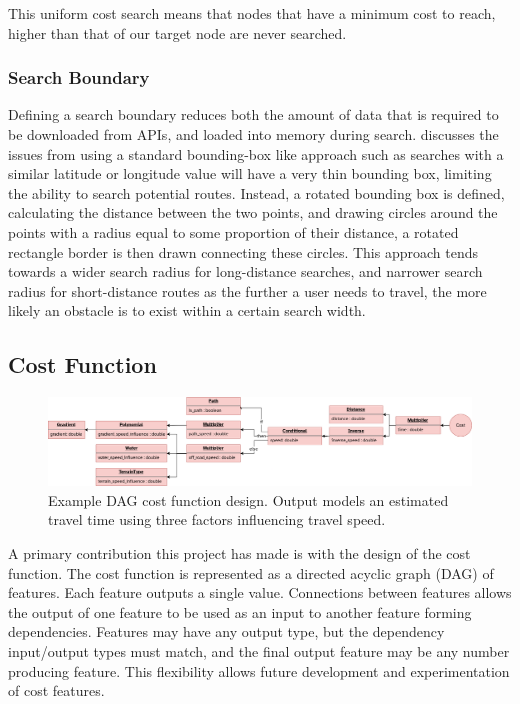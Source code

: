 \documentclass[12pt]{article}
\begin{document}
This uniform cost search means that nodes that have a minimum cost to reach, higher than that of our target node are never searched.

\subsubsection{Search Boundary}

Defining a search boundary reduces both the amount of data that is required to be downloaded from APIs, and loaded into memory during search. \textcite{evans2023tsr} discusses the issues from using a standard bounding-box like approach such as searches with a similar latitude or longitude value will have a very thin bounding box, limiting the ability to search potential routes. Instead, a rotated bounding box is defined, calculating the distance between the two points, and drawing circles around the points with a radius equal to some proportion of their distance, a rotated rectangle border is then drawn connecting these circles. This approach tends towards a wider search radius for long-distance searches,  and narrower search radius for short-distance routes as the further a user needs to travel, the more likely an obstacle is to exist within a certain search width.

\subsection{Cost Function}

\begin{figure}[H]
  \centering
  \includegraphics[width=\textwidth]{assets/costfunction-example1.png}
  \caption{Example DAG cost function design. Output models an estimated travel time using three factors influencing travel speed.}\label{fig:cost:example:1}
\end{figure}

A primary contribution this project has made is with the design of the cost function. The cost function is represented as a directed acyclic graph (DAG) of features. Each feature outputs a single value. Connections between features allows the output of one feature to be used as an input to another feature forming dependencies. Features may have any output type, but the dependency input/output types must match, and the final output feature may be any number producing feature. This flexibility allows future development and experimentation of cost features.
\end{document}
